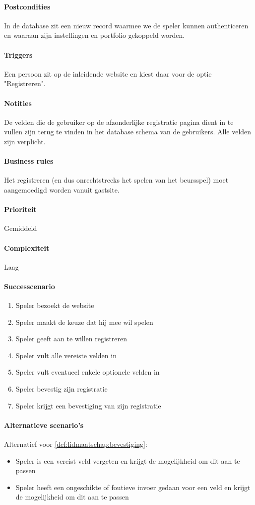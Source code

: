\paragraph{Postcondities}In de database zit een nieuw record waarmee we de speler kunnen authenticeren en waaraan zijn instellingen en portfolio gekoppeld worden.
\paragraph{Triggers}Een persoon zit op de inleidende website en kiest daar voor de optie "Registreren".
\paragraph{Notities}De velden die de gebruiker op de afzonderlijke registratie pagina dient in te vullen zijn terug te vinden in het database schema van de gebruikers. Alle velden zijn verplicht.
\paragraph{Business rules}Het registreren (en dus onrechtstreeks het spelen van het beursspel) moet aangemoedigd worden vanuit gastsite.
\paragraph{Prioriteit}Gemiddeld
\paragraph{Complexiteit}Laag
\paragraph{Successcenario}
\begin{enumerate}
 \item Speler bezoekt de website
 \item Speler maakt de keuze dat hij mee wil spelen
 \item Speler geeft aan te willen registreren
 \item Speler vult alle vereiste velden in
 \item Speler vult eventueel enkele optionele velden in
 \item Speler bevestig zijn registratie
 \item \label{def:lidmaatschap:bevestiging} Speler krijgt een bevestiging van zijn registratie
\end{enumerate}
\paragraph{Alternatieve scenario’s}
Alternatief voor \ref{def:lidmaatschap:bevestiging}:
\begin{itemize}
 \item Speler is een vereist veld vergeten en krijgt de mogelijkheid om dit aan te passen
 \item Speler heeft een ongeschikte of foutieve invoer gedaan voor een veld en krijgt de mogelijkheid om dit aan te passen
\end{itemize}
 
